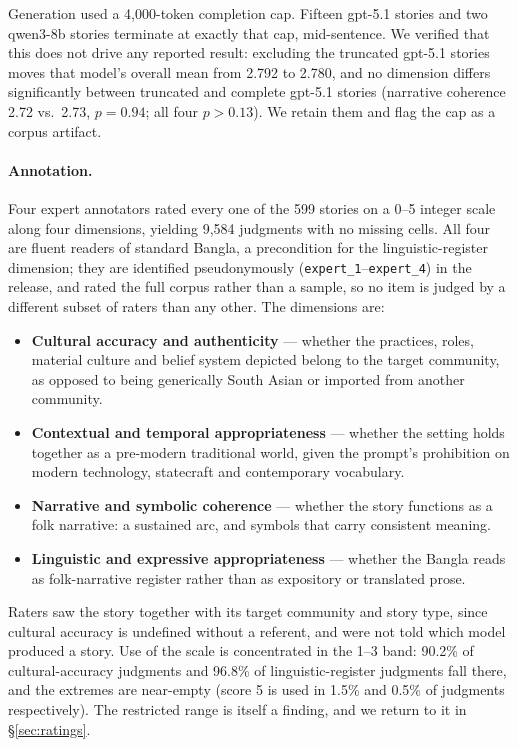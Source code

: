 \documentclass[11pt]{article}
\begin{document}
Generation used a 4{,}000-token completion cap. Fifteen gpt-5.1 stories and two
qwen3-8b stories terminate at exactly that cap, mid-sentence. We verified that
this does not drive any reported result: excluding the truncated gpt-5.1 stories
moves that model's overall mean from 2.792 to 2.780, and no dimension differs
significantly between truncated and complete gpt-5.1 stories (narrative
coherence 2.72 vs.\ 2.73, $p = 0.94$; all four $p > 0.13$). We retain them and
flag the cap as a corpus artifact.

\paragraph{Annotation.}
Four expert annotators rated every one of the 599 stories on a 0--5 integer
scale along four dimensions, yielding 9{,}584 judgments with no missing cells.
All four are fluent readers of standard Bangla, a precondition for the
linguistic-register dimension; they are identified pseudonymously
(\texttt{expert\_1}--\texttt{expert\_4}) in the release, and rated the full
corpus rather than a sample, so no item is judged by a different subset of
raters than any other. The dimensions are:

\begin{itemize}\itemsep1pt
\item \textbf{Cultural accuracy and authenticity} --- whether the practices,
roles, material culture and belief system depicted belong to the target
community, as opposed to being generically South Asian or imported from another
community.
\item \textbf{Contextual and temporal appropriateness} --- whether the setting
holds together as a pre-modern traditional world, given the prompt's
prohibition on modern technology, statecraft and contemporary vocabulary.
\item \textbf{Narrative and symbolic coherence} --- whether the story functions
as a folk narrative: a sustained arc, and symbols that carry consistent
meaning.
\item \textbf{Linguistic and expressive appropriateness} --- whether the Bangla
reads as folk-narrative register rather than as expository or translated prose.
\end{itemize}

Raters saw the story together with its target community and story type, since
cultural accuracy is undefined without a referent, and were not told which model
produced a story. Use of the scale is concentrated in the 1--3 band: 90.2\% of
cultural-accuracy judgments and 96.8\% of linguistic-register judgments fall
there, and the extremes are near-empty (score 5 is used in 1.5\% and 0.5\% of
judgments respectively). The restricted range is itself a finding, and we return to
it in \S\ref{sec:ratings}.
\end{document}
